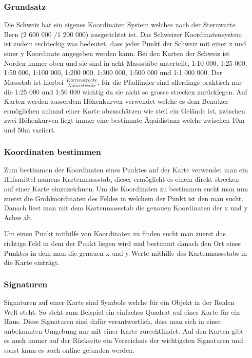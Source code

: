 \subsubsection{Grundsatz}
Die Schweiz hat ein eigenes Koordinaten System welches nach der Sternwarte Bern (2 600 000 /1 200 000) ausgerichtet ist. Das Schweizer Koordinatensystem ist zudem rechteckig was bedeutet, dass jeder Punkt der Schweiz mit einer x und einer y Koordinate angegeben werden kann. Bei den Karten der Schweiz ist Norden immer oben und sie sind in acht Massstäbe unterteilt, 1:10 000, 1:25 000, 1:50 000, 1:100 000, 1:200 000, 1:300 000, 1:500 000 und 1:1 000 000. Der Massstab ist hierbei $\frac{Kartenstrecke}{Naturstrecke}$, für die Pfadfinder sind allerdings praktisch nur die 1:25 000 und 1:50 000 wichtig da sie nicht so grosse strecken zurücklegen. Auf Karten werden ausserdem Höhenkurven verwendet welche es dem Benutzer ermöglichen anhand einer Karte abzuschätzen wie steil ein Gelände ist, zwischen zwei Höhenkurven liegt immer eine bestimmte Äquidistanz welche zwischen 10m und 50m variiert. 

\subsubsection{Koordinaten bestimmen}
Zum bestimmen der Koordinaten eines Punktes auf der Karte verwendet man ein Hilfsmittel namens Kartenmassstab, dieser ermöglicht es einem direkt strecken auf einer Karte einzuzeichnen. Um die Koordinaten zu bestimmen sucht man nun zuerst die Grobkoordinaten des Feldes in welchem der Punkt ist den man sucht. Danach liest man mit dem Kartenmassstab die genauen Koordinaten der x und y Achse ab. \par Um einen Punkt mithilfe von Koordinaten zu finden sucht man zuerst das richtige Feld in dem der Punkt liegen wird und bestimmt danach den Ort eines Punktes in dem man die genauen x und y Werte mithilfe des Kartenmassstabs in die Karte einträgt.

\subsubsection{Signaturen}

Signaturen auf einer Karte sind Symbole welche für ein Objekt in der Realen Welt steht. So steht zum Beispiel ein einfaches Quadrat auf einer Karte für ein Haus. Diese Signaturen sind dafür verantwortlich, dass man sich in einer unbekannten Umgebung nur mit einer Karte zurechtfindet. Auf den Karten gibt es auch immer auf der Rückseite ein Verzeichnis der wichtigsten Signaturen und sonst kann es auch online gefunden werden\cite{oa_zeichenerklarung_nodate}.

